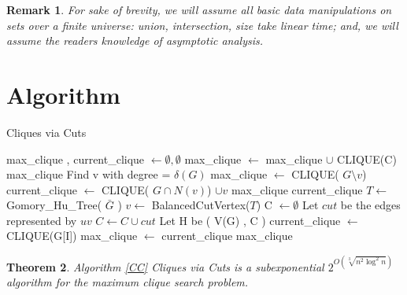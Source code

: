 \documentclass[12pt]{article}
\newtheorem{thm}{Theorem}[section]
\newtheorem{rem}[thm]{Remark}
\begin{document}
\begin{rem}\label{brevity} For sake of brevity, we will assume all basic data manipulations on sets over a finite universe: union, intersection, size take linear time; and, we will assume the readers knowledge of asymptotic analysis.
\end{rem}

\section{Algorithm}

\begin{algorithm}
\caption{Cliques via Cuts\label{CC} } 
\begin{algorithmic}[1]
\State max\_clique , current\_clique $\gets \emptyset, \emptyset$
\State max\_clique $\gets$ max\_clique $\cup$ CLIQUE(C)
\EndFor
\State \Return max\_clique
\EndIf
{}
\State Find v with degree = $\delta(G)$
\State max\_clique $\gets$ CLIQUE( $G \setminus v$)
\State current\_clique $\gets$ CLIQUE( $G \cap N(v) $) $\cup v$
 {\Return max\_clique} \EndIf \Return current\_clique
\EndIf
\State $ T \gets$ Gomory\_Hu\_Tree( $\bar{G}$ )
\State $ v \gets$ BalancedCutVertex($T$)
\State C $\gets \emptyset $
\State Let $cut$ be the edges represented by $uv$
\State $C \gets C \cup cut $
\EndFor
\State Let H be ( V(G) , C )
\State current\_clique $\gets$ CLIQUE(G[I])
max\_clique $\gets$ current\_clique \EndIf
\EndFor
\State \Return max\_clique
\EndProcedure
\end{algorithmic}
\end{algorithm}

\begin{thm} \label{main} Algorithm \ref{CC} Cliques via Cuts  is a subexponential $2^{O(\sqrt[3]{n^2\log^2n})}$ algorithm for the maximum clique search problem. \end{thm}
\end{document}
